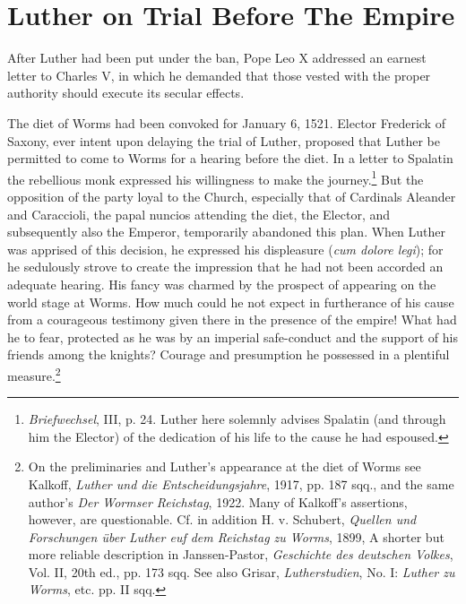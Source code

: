 \section{Luther on Trial Before The Empire}

After Luther had been put under the ban, Pope Leo X addressed an
earnest letter to Charles V, in which he demanded that those vested
with the proper authority should execute its secular effects.

The diet of Worms had been convoked for January 6, 1521. Elector Frederick
of Saxony, ever intent upon delaying the trial of
Luther, proposed that Luther be permitted to come to Worms
for a hearing before the diet. In a letter to Spalatin the rebellious
monk expressed his willingness to make the journey.\footnote
{\textit{Briefwechsel}, III, p. 24. Luther here solemnly advises Spalatin (and through him the
Elector) of the dedication of his life to the cause he had espoused.}
But the opposition
of the party loyal to the Church, especially that of Cardinals
Aleander and Caraccioli, the papal nuncios attending the diet, the
Elector, and subsequently also the Emperor, temporarily abandoned
this plan. When Luther was apprised of this decision, he expressed his
displeasure (\textit{cum dolore legi}); for he sedulously strove to create the
impression that he had not been accorded an adequate hearing. His
fancy was charmed by the prospect of appearing on the world stage
at Worms. How much could he not expect in furtherance of his
cause from a courageous testimony given there in the presence of
the empire! What had he to fear, protected as he was by an imperial
safe-conduct and the support of his friends among the knights?
Courage and presumption he possessed in a plentiful measure.\footnote
{On the preliminaries and Luther’s appearance at the diet of Worms see Kalkoff, \textit{Luther
und die Entscheidungsjahre}, 1917, pp. 187 sqq., and the same author’s \textit{Der Wormser
Reichstag}, 1922. Many of Kalkoff’s assertions, however, are questionable. Cf. in addition H.
v. Schubert, \textit{Quellen und Forschungen über Luther euf dem Reichstag zu Worms}, 1899,
A shorter but more reliable description in Janssen-Pastor, \textit{Geschichte des deutschen Volkes},
Vol. II, 20th ed., pp. 173 sqq. See also Grisar, \textit{Lutherstudien}, No. I: \textit{Luther zu Worms}, etc.
pp. II sqq.}

